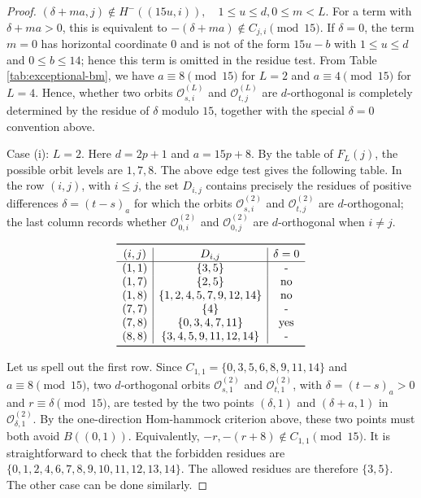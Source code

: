 \documentclass[12pt]{article}
\theoremstyle{plain}
\theoremstyle{definition}
\renewcommand{\leq}{\leqslant}
\begin{document}
\begin{proof}
\((\delta+ma,j)\notin H^-((15u,i)), \quad 1\leq u\leq d, 0\leq m< L.\)
For a term with \(\delta+ma>0\), this is equivalent to 
\(-(\delta+ma)\notin C_{j,i} \pmod{15}.\)
If \(\delta=0\), the term \(m=0\) has horizontal coordinate \(0\) and is not of the form \(15u-b\) with \(1\leq u\leq d\) and \(0\leq b\leq14\); hence this term is omitted in the residue test. From Table \ref{tab:exceptional-bm}, we have \(a\equiv 8\pmod{15}\) for \(L=2\) and \(a\equiv 4\pmod{15}\) for \(L=4\). Hence, whether two orbits $\mathcal O_{s,i}^{(L)}$ and $\mathcal O_{t,j}^{(L)}$ are $d$-orthogonal is completely determined by the residue of $\delta$ modulo $15$, together with the special \(\delta=0\) convention above. 

 



 
Case (i): \(L=2\).  Here \(d=2p+1\) and \(a=15p+8\).  By the table of
\(F_L(j)\), the possible orbit levels are \(1,7,8\).  The above edge test gives
the following table.  In the row \((i,j)\), with \(i\leq j\), the set \(D_{i,j}\)
contains precisely the residues of positive differences 
\(\delta=(t-s)_a\) for which
the orbits $\mathcal O_{s,i}^{(2)}$ and $\mathcal O_{t,j}^{(2)}$ are $d$-orthogonal; the last column records
whether $\mathcal O_{0,i}^{(2)}$ and $\mathcal O_{0,j}^{(2)}$ are $d$-orthogonal when $i\neq j$. 
\begin{center}
\[
\begin{array}{c|c|c}
\toprule
(i,j)&D_{i,j}&\delta=0\\
\hline
(1,1)&\{3,5\}&\text{-}\\
(1,7)&\{2,5\}&\text{no}\\
(1,8)&\{1,2,4,5,7,9,12,14\}&\text{no}\\
(7,7)&\{4\}&\text{-}\\
(7,8)&\{0,3,4,7,11\}&\text{yes}\\
(8,8)&\{3,4,5,9,11,12,14\}&\text{-}\\
\bottomrule
\end{array}
\]
\label{tab:E8-L2-Dij}
\end{center}
Let us spell out the first row.  Since \(C_{1,1}=\{0,3,5,6,8,9,11,14\}\)
and \(a\equiv8\pmod {15}\), two $d$-orthogonal orbits
\(\mathcal O_{s,1}^{(2)}\) and \(\mathcal O_{t,1}^{(2)}\), with
\(\delta=(t-s)_a>0\) and \(r\equiv\delta\pmod {15}\), are tested by the two
points \((\delta,1)\) and \((\delta+a,1)\) in
\(\mathcal O_{\delta,1}^{(2)}\).  By the one-direction Hom-hammock criterion
above, these two points must both avoid \(B((0,1))\).  Equivalently,
\(-r, -(r+8)\notin C_{1,1}\pmod{15}\). It is straightforward to check that the forbidden residues are 
\(\{0,1,2,4,6,7,8,9,10,11,12,13,14\}.\)
The allowed residues are therefore \(\{3,5\}\). The other case can be done similarly. 


\end{proof}
\end{document}
